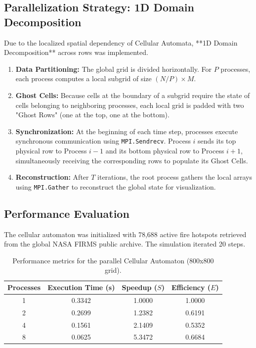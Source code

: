 \documentclass[12pt,a4paper]{article}
\begin{document}
\subsection{Parallelization Strategy: 1D Domain Decomposition}
Due to the localized spatial dependency of Cellular Automata, **1D Domain Decomposition** across rows was implemented.
\begin{enumerate}
    \item \textbf{Data Partitioning:} The global grid is divided horizontally. For $P$ processes, each process computes a local subgrid of size $(N/P) \times M$.
    \item \textbf{Ghost Cells:} Because cells at the boundary of a subgrid require the state of cells belonging to neighboring processes, each local grid is padded with two "Ghost Rows" (one at the top, one at the bottom).
    \item \textbf{Synchronization:} At the beginning of each time step, processes execute synchronous communication using \texttt{MPI.Sendrecv}. Process $i$ sends its top physical row to Process $i-1$ and its bottom physical row to Process $i+1$, simultaneously receiving the corresponding rows to populate its Ghost Cells.
    \item \textbf{Reconstruction:} After $T$ iterations, the root process gathers the local arrays using \texttt{MPI.Gather} to reconstruct the global state for visualization.
\end{enumerate}

\subsection{Performance Evaluation}
The cellular automaton was initialized with 78,688 active fire hotspots retrieved from the global NASA FIRMS public archive. The simulation iterated 20 steps.

\begin{table}[H]
\centering
\begin{tabular}{@{}cccc@{}}
\toprule
\textbf{Processes} & \textbf{Execution Time (s)} & \textbf{Speedup ($S$)} & \textbf{Efficiency ($E$)} \\ \midrule
1                  & 0.3342                      & 1.0000                 & 1.0000                    \\
2                  & 0.2699                      & 1.2382                 & 0.6191                    \\
4                  & 0.1561                      & 2.1409                 & 0.5352                    \\
8                  & 0.0625                      & 5.3472                 & 0.6684                    \\ \bottomrule
\end{tabular}
\caption{Performance metrics for the parallel Cellular Automaton (800x800 grid).}
\label{tab:ca_bench}
\end{table}
\end{document}
